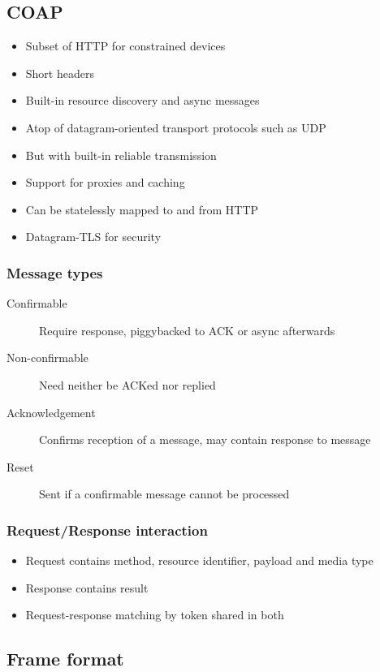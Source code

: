 \subsection{COAP}

\begin{itemize}
		\item Subset of HTTP for constrained devices
		\item Short headers
		\item Built-in resource discovery and async messages
		\item Atop of datagram-oriented transport protocols such as UDP
		\item But with built-in reliable transmission
		\item Support for proxies and caching
		\item Can be statelessly mapped to and from HTTP
		\item Datagram-TLS for security
\end{itemize}

\subsubsection{Message types}

\begin{description}
		\item[Confirmable] Require response, piggybacked to ACK or async
				afterwards
		\item[Non-confirmable] Need neither be ACKed nor replied
		\item[Acknowledgement] Confirms reception of a message, may contain
				response to message
		\item[Reset] Sent if a confirmable message cannot be processed
\end{description}

\subsubsection{Request/Response interaction}

\begin{itemize}
		\item Request contains method, resource identifier, payload and media type
		\item Response contains result
		\item Request-response matching by token shared in both
\end{itemize}

\subsection{Frame format}

